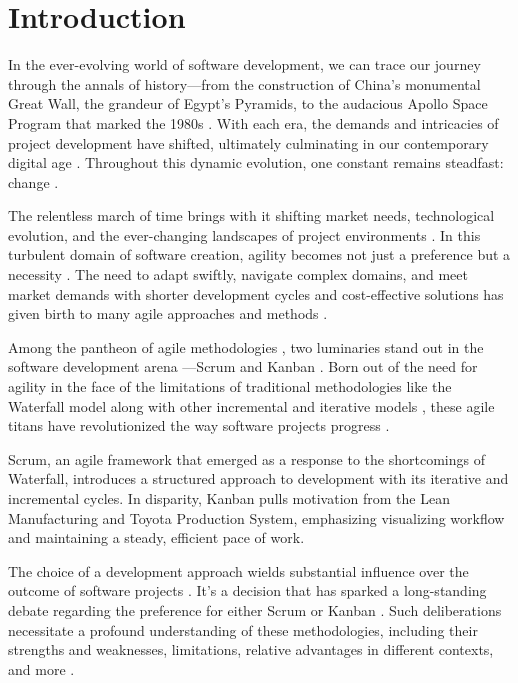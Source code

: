 \documentclass[conference]{IEEEtran}
\begin{document}
\section{Introduction}
In the ever-evolving world of software development, we can trace our journey through the annals of history—from the construction of China's monumental Great Wall, the grandeur of Egypt's Pyramids, to the audacious Apollo Space Program that marked the 1980s \cite{kwak2005brief}. With each era, the demands and intricacies of project development have shifted, ultimately culminating in our contemporary digital age \cite{seymour2014history}. Throughout this dynamic evolution, one constant remains steadfast: change \cite{kabeyi2019evolution}.

The relentless march of time brings with it shifting market needs, technological evolution, and the ever-changing landscapes of project environments \cite{padalkar2016six}. In this turbulent domain of software creation, agility becomes not just a preference \cite{dybaa2008empirical} but a necessity \cite{abrahamsson2017agile}. The need to adapt swiftly, navigate complex domains, and meet market demands with shorter development cycles and cost-effective solutions has given birth to many agile approaches and methods \cite{misra2012agile, rigby2016secret}.

Among the pantheon of agile methodologies \cite{rasnacis2017method, coram2005impact}, two luminaries stand out in the software development arena —Scrum\cite{schwaber2001agile} and Kanban \cite{ahmad2013kanban}. Born out of the need for agility in the face of the limitations of traditional methodologies like the Waterfall model \cite{thesing2021agile, amlani2012advantages} along with other incremental \cite{hibbs2009art} and iterative models \cite{mitchell2009comparison}, these agile titans have revolutionized the way software projects progress \cite{al2020agile}. 

Scrum, an agile framework that emerged as a response to the shortcomings of Waterfall, introduces a structured approach to development with its iterative and incremental cycles. In disparity, Kanban pulls motivation from the Lean Manufacturing and Toyota Production System, emphasizing visualizing workflow and maintaining a steady, efficient pace of work.

The choice of a development approach wields substantial influence over the outcome of software projects \cite{despa2014comparative}. It's a decision that has sparked a long-standing debate regarding the preference for either Scrum or Kanban \cite{lei2017statistical}. Such deliberations necessitate a profound understanding of these methodologies, including their strengths and weaknesses, limitations, relative advantages in different contexts, and more \cite{zayat2020framework}.
\end{document}

